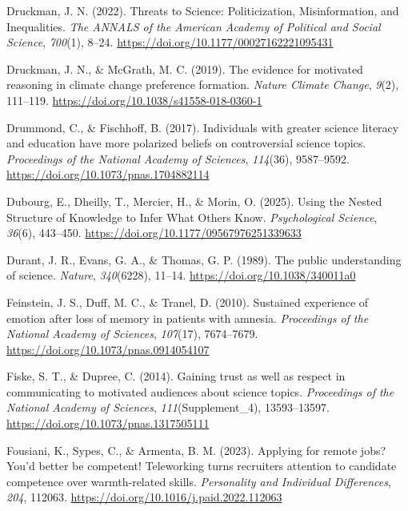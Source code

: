\documentclass[
  jou,
  floatsintext,
  longtable,
  nolmodern,
  notxfonts,
  notimes,
  colorlinks=true,linkcolor=blue,citecolor=blue,urlcolor=blue]{apa7}
\newlength{\cslhangindent}
\newenvironment{CSLReferences}[2] %
 {\begin{list}{}{%
  \setlength{\itemindent}{0pt}
  \setlength{\leftmargin}{0pt}
  \setlength{\parsep}{0pt}
  \ifodd #1
   \setlength{\leftmargin}{\cslhangindent}
   \setlength{\itemindent}{-1\cslhangindent}
  \fi
  \setlength{\itemsep}{#2\baselineskip}}}
 {\end{list}}
\begin{document}
\begin{CSLReferences}{1}{0}
Druckman, J. N. (2022). Threats to Science: Politicization,
Misinformation, and Inequalities. \emph{The ANNALS of the American
Academy of Political and Social Science}, \emph{700}(1), 8--24.
\url{https://doi.org/10.1177/00027162221095431}

Druckman, J. N., \& McGrath, M. C. (2019). The evidence for motivated
reasoning in climate change preference formation. \emph{Nature Climate
Change}, \emph{9}(2), 111--119.
\url{https://doi.org/10.1038/s41558-018-0360-1}

Drummond, C., \& Fischhoff, B. (2017). Individuals with greater science
literacy and education have more polarized beliefs on controversial
science topics. \emph{Proceedings of the National Academy of Sciences},
\emph{114}(36), 9587--9592.
\url{https://doi.org/10.1073/pnas.1704882114}

Dubourg, E., Dheilly, T., Mercier, H., \& Morin, O. (2025). Using the
Nested Structure of Knowledge to Infer What Others Know.
\emph{Psychological Science}, \emph{36}(6), 443--450.
\url{https://doi.org/10.1177/09567976251339633}

Durant, J. R., Evans, G. A., \& Thomas, G. P. (1989). The public
understanding of science. \emph{Nature}, \emph{340}(6228), 11--14.
\url{https://doi.org/10.1038/340011a0}

Feinstein, J. S., Duff, M. C., \& Tranel, D. (2010). Sustained
experience of emotion after loss of memory in patients with amnesia.
\emph{Proceedings of the National Academy of Sciences}, \emph{107}(17),
7674--7679. \url{https://doi.org/10.1073/pnas.0914054107}

Fiske, S. T., \& Dupree, C. (2014). Gaining trust as well as respect in
communicating to motivated audiences about science topics.
\emph{Proceedings of the National Academy of Sciences},
\emph{111}(Supplement{\_}4), 13593--13597.
\url{https://doi.org/10.1073/pnas.1317505111}

Fousiani, K., Sypes, C., \& Armenta, B. M. (2023). Applying for remote
jobs? You'd better be competent! Teleworking turns recruiters attention
to candidate competence over warmth-related skills. \emph{Personality
and Individual Differences}, \emph{204}, 112063.
\url{https://doi.org/10.1016/j.paid.2022.112063}


\end{CSLReferences}
\end{document}
